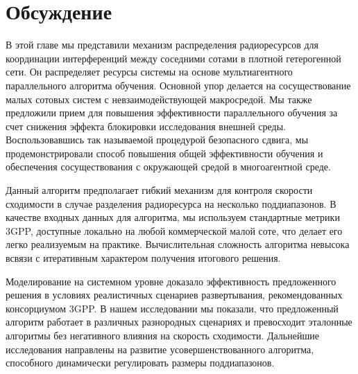 \section{Обсуждение}
В этой главе мы представили механизм распределения радиоресурсов для координации интерференций между соседними сотами в плотной гетерогенной сети. Он распределяет ресурсы системы на основе мультиагентного параллельного алгоритма обучения. Основной упор делается на сосуществование малых сотовых систем с невзаимодействующей макросредой. Мы также предложили прием для повышения эффективности параллельного обучения за счет снижения эффекта блокировки исследования внешней среды. Воспользовавшись так называемой процедурой безопасного сдвига, мы продемонстрировали способ повышения общей эффективности обучения и обеспечения сосуществования с окружающей средой в многоагентной среде.

Данный алгоритм предполагает гибкий механизм для контроля скорости сходимости в случае разделения радиоресурса на несколько поддиапазонов. В качестве входных данных для алгоритма, мы используем стандартные метрики 3GPP, доступные локально на любой коммерческой малой соте, что делает его легко реализуемым на практике. Вычислительная сложность алгоритма невысока всвязи с итеративным характером получения итогового решения.

Моделирование на системном уровне доказало эффективность предложенного решения в условиях реалистичных сценариев развертывания, рекомендованных консорциумом 3GPP. В нашем исследовании мы показали, что предложенный алгоритм работает в различных разнородных сценариях и превосходит эталонные алгоритмы без негативного влияния на скорость сходимости. Дальнейшие исследования направлены на развитие усовершенствованного алгоритма, способного динамически регулировать размеры поддиапазонов.
